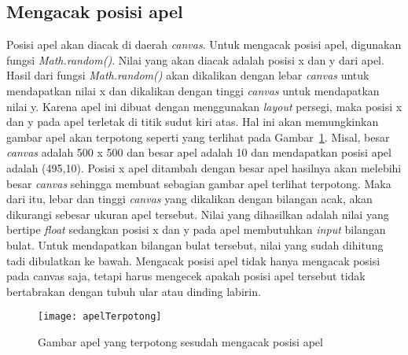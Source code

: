 \subsection{Mengacak posisi apel}
Posisi apel akan diacak di daerah \textit{canvas}. Untuk mengacak posisi apel, digunakan fungsi \textit{Math.random()}. Nilai yang akan diacak adalah posisi x dan y dari apel. Hasil dari fungsi \textit{Math.random()} akan dikalikan dengan lebar \textit{canvas} untuk mendapatkan nilai x dan dikalikan dengan tinggi \textit{canvas} untuk mendapatkan nilai y. Karena apel ini dibuat dengan menggunakan \textit{layout} persegi, maka posisi x dan y pada apel terletak di titik sudut kiri atas. Hal ini akan memungkinkan gambar apel akan terpotong seperti yang terlihat pada Gambar~\ref{fig:apelTerpotong}. Misal, besar \textit{canvas} adalah 500 x 500 dan besar apel adalah 10 dan mendapatkan posisi apel adalah (495,10). Posisi x apel ditambah dengan besar apel hasilnya akan melebihi besar \textit{canvas} sehingga membuat sebagian gambar apel terlihat terpotong. Maka dari itu, lebar dan tinggi \textit{canvas} yang dikalikan dengan bilangan acak, akan dikurangi sebesar ukuran apel tersebut.  Nilai yang dihasilkan adalah nilai yang bertipe \textit{float} sedangkan posisi x dan y pada apel membutuhkan \textit{input} bilangan bulat. Untuk mendapatkan bilangan bulat tersebut, nilai yang sudah dihitung tadi dibulatkan ke bawah. Mengacak posisi apel tidak hanya mengacak posisi pada canvas saja, tetapi harus mengecek apakah posisi apel tersebut tidak bertabrakan dengan tubuh ular atau dinding labirin. 

\begin{figure}[H]
	\centering  
	\texttt{[image: apelTerpotong]}  
	\caption[Gambar apel yang terpotong sesudah mengacak posisi apel]{Gambar apel yang terpotong sesudah mengacak posisi apel}
	\label{fig:apelTerpotong} 
\end{figure}

